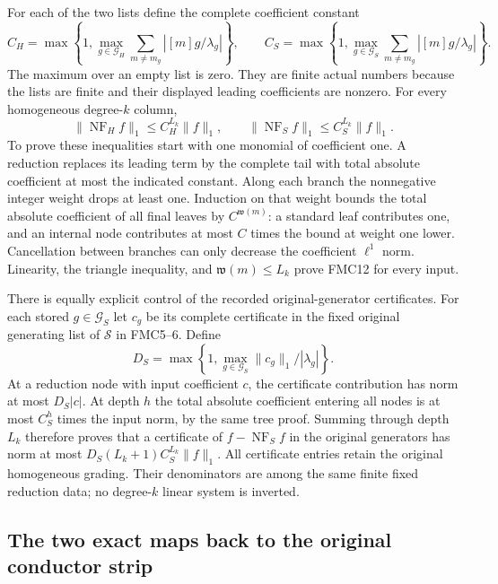 \documentclass[11pt,a4paper]{article}
\begin{document}
For each of the two lists define the complete coefficient constant
\[
 C_H=\max\left\{1,\max_{g\in\mathcal G_H}
                 \sum_{m\ne m_g}|[m]g/\lambda_g|\right\},
 \qquad
 C_S=\max\left\{1,\max_{g\in\mathcal G_S}
                 \sum_{m\ne m_g}|[m]g/\lambda_g|\right\}.
 \tag{FMC11}
\]
The maximum over an empty list is zero. They are finite actual
numbers because the lists are finite and their displayed leading
coefficients are nonzero. For every homogeneous degree-$k$ column,
\[
 \|\operatorname{NF}_H f\|_1\le C_H^{L_k}\|f\|_1,
 \qquad
 \|\operatorname{NF}_S f\|_1\le C_S^{L_k}\|f\|_1.
 \tag{FMC12}
\]
To prove these inequalities start with one monomial of coefficient
one. A reduction replaces its leading term by the complete tail with
total absolute coefficient at most the indicated constant. Along
each branch the nonnegative integer weight drops at least one.
Induction on that weight bounds the total absolute coefficient of
all final leaves by $C^{\mathfrak w(m)}$: a standard leaf contributes
one, and an internal node contributes at most $C$ times the bound at
weight one lower. Cancellation between branches can only decrease the
coefficient $\ell^1$ norm. Linearity, the triangle inequality, and
$\mathfrak w(m)\le L_k$ prove FMC12 for every input.

There is equally explicit control of the recorded original-generator
certificates. For each stored $g\in\mathcal G_S$ let
$c_g$ be its complete certificate in the fixed original generating
list of $\mathscr S$ in FMC5--6. Define
\[
 D_S=\max\left\{1,\max_{g\in\mathcal G_S}
                             \|c_g\|_1/|\lambda_g|\right\}.
 \tag{FMC13}
\]
At a reduction node with input coefficient $c$, the certificate
contribution has norm at most $D_S|c|$. At depth $h$ the total
absolute coefficient entering all nodes is at most $C_S^h$ times
the input norm, by the same tree proof. Summing through depth $L_k$
therefore proves that a certificate of
$f-\operatorname{NF}_S f$ in the original generators has norm at most
$D_S(L_k+1)C_S^{L_k}\|f\|_1$. All certificate entries retain the
original homogeneous grading. Their denominators are among the same
finite fixed reduction data; no degree-$k$ linear system is inverted.

\subsection{The two exact maps back to the original conductor strip}
\end{document}
